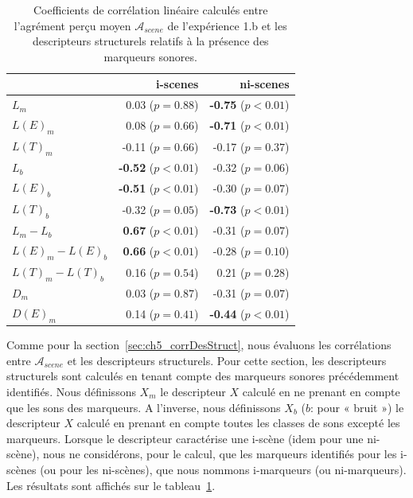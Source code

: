 \begin{table}[t]
\centering
\begin{tabular}{l r r} 
                  &   i-scenes                  & ni-scenes \\
\hline
$L_m$              & 0.03  ($p=0.88$)           & \textbf{-0.75} ($p<0.01$) \\
$L(E)_m$           & 0.08  ($p=0.66$)           & \textbf{-0.71} ($p<0.01$) \\
$L(T)_m$           & -0.11 ($p=0.66$)           & -0.17 ($p=0.37$) \\
$L_b$              & \textbf{-0.52} ($p<0.01$)  & -0.32 ($p=0.06$) \\
$L(E)_b$           & \textbf{-0.51} ($p<0.01$)  & -0.30 ($p=0.07$) \\
$L(T)_b$           & -0.32 ($p=0.05$)           & \textbf{-0.73} ($p<0.01$) \\
$L_m-L_b$          & \textbf{0.67} ($p<0.01$)   & -0.31 ($p=0.07$) \\
$L(E)_m-L(E)_b$    & \textbf{0.66} ($p<0.01$)   & -0.28 ($p=0.10$) \\
$L(T)_m-L(T)_b$    & 0.16 ($p=0.54$)            & 0.21 ($p=0.28$) \\
$D_m$              & 0.03 ($p=0.87$)            & -0.31 ($p=0.07$) \\
$D(E)_m$           & 0.14 ($p=0.41$)            & \textbf{-0.44} ($p<0.01$) \\
\hline
\end{tabular}
\vspace{0.5mm}
\caption{Coefficients de corrélation linéaire calculés entre l'agrément perçu moyen $\mathcal{A}_{scene}$ de l'expérience 1.b et les descripteurs structurels relatifs à la présence des marqueurs sonores.}
\label{tab:corrMarkers}
\end{table}

Comme pour la  section~\ref{sec:ch5_corrDesStruct}, nous évaluons les corrélations entre $\mathcal{A}_{scene}$ et les descripteurs structurels. Pour cette section, les descripteurs structurels sont calculés en tenant compte des marqueurs sonores précédemment identifiés. Nous définissons $X_m$ le descripteur $X$ calculé en ne prenant en compte que les sons des marqueurs. A l'inverse, nous définissons $X_b$ ($b$: pour « bruit ») le descripteur $X$ calculé en prenant en compte toutes les classes de sons excepté les marqueurs. Lorsque le descripteur caractérise une i-scène (idem pour une ni-scène), nous ne considérons, pour le calcul, que les marqueurs identifiés pour les i-scènes (ou pour les ni-scènes), que nous nommons i-marqueurs (ou ni-marqueurs). Les résultats sont affichés sur le tableau~\ref{tab:corrMarkers}.

